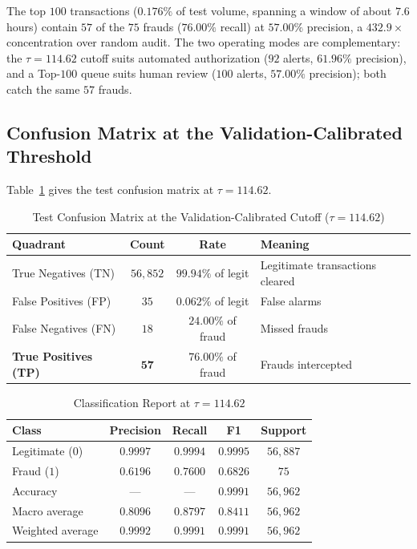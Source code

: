 \documentclass[11pt, a4paper]{article}
\begin{document}
The top $100$ transactions ($0.176\%$ of test volume, spanning a window of about $7.6$ hours) contain $57$ of the $75$ frauds ($76.00\%$ recall) at $57.00\%$ precision, a $432.9\times$ concentration over random audit. The two operating modes are complementary: the $\tau = 114.62$ cutoff suits automated authorization ($92$ alerts, $61.96\%$ precision), and a Top-$100$ queue suits human review ($100$ alerts, $57.00\%$ precision); both catch the same $57$ frauds.

\subsection{Confusion Matrix at the Validation-Calibrated Threshold}
Table~\ref{tab:cm} gives the test confusion matrix at $\tau = 114.62$.

\begin{table}[h!]
\centering
\caption{Test Confusion Matrix at the Validation-Calibrated Cutoff ($\tau = 114.62$)}
\vspace{0.2cm}
\renewcommand{\arraystretch}{1.25}
\small
\begin{tabular}{lccl}
\toprule
\rowcolor{tableheader}
\textbf{Quadrant} & \textbf{Count} & \textbf{Rate} & \textbf{Meaning} \\
\midrule
True Negatives (TN) & $56{,}852$ & $99.94\%$ of legit & Legitimate transactions cleared \\
\rowcolor{rowalt}
False Positives (FP) & $35$ & $0.062\%$ of legit & False alarms \\
False Negatives (FN) & $18$ & $24.00\%$ of fraud & Missed frauds \\
\rowcolor{rowalt}
\textbf{True Positives (TP)} & $\mathbf{57}$ & $\mathbf{76.00\%}$ of fraud & Frauds intercepted \\
\bottomrule
\end{tabular}
\label{tab:cm}
\end{table}

\begin{table}[h!]
\centering
\caption{Classification Report at $\tau = 114.62$}
\vspace{0.2cm}
\renewcommand{\arraystretch}{1.2}
\small
\begin{tabular}{lcccc}
\toprule
\rowcolor{tableheader}
\textbf{Class} & \textbf{Precision} & \textbf{Recall} & \textbf{F1} & \textbf{Support} \\
\midrule
Legitimate ($0$) & $0.9997$ & $0.9994$ & $0.9995$ & $56{,}887$ \\
\rowcolor{rowalt}
Fraud ($1$) & $0.6196$ & $0.7600$ & $0.6826$ & $75$ \\
Accuracy & --- & --- & $0.9991$ & $56{,}962$ \\
\rowcolor{rowalt}
Macro average & $0.8096$ & $0.8797$ & $0.8411$ & $56{,}962$ \\
Weighted average & $0.9992$ & $0.9991$ & $0.9991$ & $56{,}962$ \\
\bottomrule
\end{tabular}
\label{tab:classreport}
\end{table}
\end{document}
